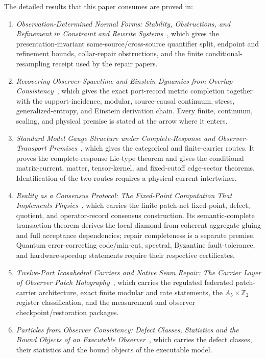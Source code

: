 \documentclass[11pt]{article}
\begin{document}
The detailed results that this paper consumes are proved in:
\begin{enumerate}[leftmargin=2em]
\item \emph{Observation-Determined Normal Forms: Stability, Obstructions, and Refinement in Constraint and Rewrite Systems}~\cite{observableNormalForms}, which gives the presentation-invariant same-source/cross-source quantifier split, endpoint and refinement bounds, collar-repair obstructions, and the finite conditional-resampling receipt used by the repair papers.
\item \emph{Recovering Observer Spacetime and Einstein Dynamics from Overlap
Consistency}~\cite{ophEinstein}, which gives the exact port-record metric
completion together with the support-incidence, modular, source-causal continuum,
stress, generalized-entropy, and Einstein derivation chain. Every finite,
continuum, scaling, and physical premise is stated at the arrow where it
enters.
\item {\raggedright \emph{Standard Model Gauge Structure under Complete-Response and Observer-Transport Premises}~\cite{ophGauge}, which gives the categorical and finite-carrier routes. It proves the complete-response Lie-type theorem and gives the conditional matrix-current, matter, tensor-kernel, and fixed-cutoff edge-sector theorems. Identification of the two routes requires a physical current intertwiner.\par}
\item \emph{Reality as a Consensus Protocol: The Fixed-Point Computation That Implements Physics}~\cite{ophconsensus}, which carries the finite patch-net fixed-point, defect, quotient, and operator-record consensus construction. Its semantic-complete transaction theorem derives the local diamond from coherent aggregate gluing and full acceptance dependencies; repair completeness is a separate premise. Quantum error-correcting code/min-cut, spectral, Byzantine fault-tolerance, and hardware-speedup statements require their respective certificates.
\item \emph{Twelve-Port Icosahedral Carriers and Native Seam Repair: The Carrier Layer of Observer Patch Holography}~\cite{ophmicrophysics}, which carries the regulated federated patch-carrier architecture, exact finite modular and rate statements, the \(A_5\times\mathbb Z_2\) register classification, and the measurement and observer checkpoint/restoration packages.
\item \emph{Particles from Observer Consistency: Defect Classes, Statistics and the Bound Objects of an Executable Observer}~\cite{ophparticles}, which carries the defect classes, their statistics and the bound objects of the executable model.

\end{enumerate}
\end{document}
